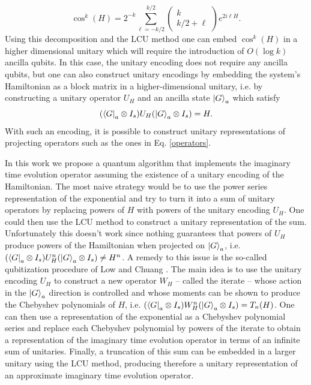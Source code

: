 \documentclass[a4paper,11pt]{article}
\begin{document}
\begin{equation}
    \cos^k(H) =2^{-k} \sum_{\ell=-k/2}^{k/2}\begin{pmatrix}
        k \\
        k/2 + \ell
    \end{pmatrix} e^{2 i \ell H}.
\end{equation}
Using this decomposition and the LCU method one can embed $\cos^k(H)$ in a higher dimensional unitary which will require the introduction of $O(\log k)$ ancilla qubits. In this case, the unitary encoding does not require any ancilla qubits, but one can also construct unitary encodings by embedding the system's Hamiltonian as a block matrix in a higher-dimensional unitary, i.e. by constructing a unitary operator $U_H$ and an ancilla state $\ket{G}_a$ which satisfy 
\begin{equation}
   ( \bra{G}_a\otimes I_s)U_H( \ket{G}_a\otimes I_s) = H.
\end{equation}
With such an encoding, it is possible to construct unitary representations of projecting operators such as the ones in Eq. \eqref{operators}. 

In this work we propose a quantum algorithm that implements the imaginary time evolution operator assuming the existence of a unitary encoding of the Hamiltonian. The most naive strategy would be to use the power series representation of the exponential and try to turn it into a sum of unitary operators by replacing powers of $H$ with powers of the unitary encoding $U_H$. One could then use the LCU method to construct a unitary representation of the sum. Unfortunately this doesn't work since nothing guarantees that powers of $U_H$ produce powers of the Hamiltonian when projected on $\ket{G}_a$, i.e. $( \bra{G}_a\otimes I_s)U_H^n( \ket{G}_a\otimes I_s) \neq H^n$. A remedy to this issue is the so-called qubitization procedure of Low and Chuang \cite{Low2019hamiltonian}. The main idea is to use the unitary encoding $U_H$ to construct a new operator $W_H$ -- called the iterate -- whose action in the $\ket{G}_a$ direction is controlled and whose moments can be shown to produce the Chebyshev polynomials of $H$, i.e. 
$( \bra{G}_a\otimes I_s)W_H^n( \ket{G}_a\otimes I_s) = T_n(H)$. One can then use a representation of the exponential as a Chebyshev polynomial series and replace each Chebyshev polynomial by powers of the iterate to obtain a representation of the imaginary time evolution operator in terms of an infinite sum of unitaries. Finally, a truncation of this sum can be embedded in a larger unitary using the LCU method, producing therefore a unitary representation of an approximate imaginary time evolution operator.
\end{document}
